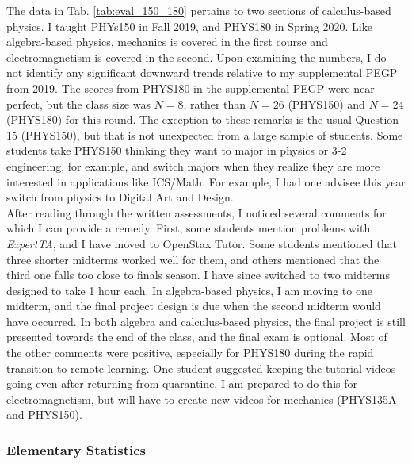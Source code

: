 \documentclass[../../main.tex]{subfiles}
\begin{document}
The data in Tab. \ref{tab:eval_150_180} pertains to two sections of calculus-based physics.  I taught PHYs150 in Fall 2019, and PHYS180 in Spring 2020.  Like algebra-based physics, mechanics is covered in the first course and electromagnetism is covered in the second.  Upon examining the numbers, I do not identify any significant downward trends relative to my supplemental PEGP from 2019.  The scores from PHYS180 in the supplemental PEGP were near perfect, but the class size was $N = 8$, rather than $N = 26$ (PHYS150) and $N = 24$ (PHYS180) for this round.  The exception to these remarks is the usual Question 15 (PHYS150), but that is not unexpected from a large sample of students.  Some students take PHYS150 thinking they want to major in physics or 3-2 engineering, for example, and switch majors when they realize they are more interested in applications like ICS/Math.  For example, I had one advisee this year switch from physics to Digital Art and Design.
\\
\vspace{0.25cm}
After reading through the written assessments, I noticed several comments for which I can provide a remedy.  First, some students mention problems with \textit{ExpertTA}, and I have moved to OpenStax Tutor.  Some students mentioned that three shorter midterms worked well for them, and others mentioned that the third one falls too close to finals season.  I have since switched to two midterms designed to take 1 hour each.  In algebra-based physics, I am moving to one midterm, and the final project design is due when the second midterm would have occurred.  In both algebra and calculus-based physics, the final project is still presented towards the end of the class, and the final exam is optional.  Most of the other comments were positive, especially for PHYS180 during the rapid transition to remote learning.  One student suggested keeping the tutorial videos going even after returning from quarantine.  I am prepared to do this for electromagnetism, but will have to create new videos for mechanics (PHYS135A and PHYS150).

\subsubsection{Elementary Statistics}
\end{document}
